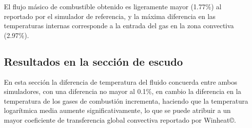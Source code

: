 \par El flujo másico de combustible obtenido es ligeramente mayor (1.77\%) al reportado por el simulador de referencia, y la máxima diferencia en las temperaturas internas corresponde a la entrada del gas en la zona convectiva (2.97\%).

\subsection{Resultados en la sección de escudo}
\par En esta sección la diferencia de temperatura del fluido concuerda entre ambos simuladores, con una diferencia no mayor al 0.1\%, en cambio la diferencia en la temperatura de los gases de combustión incrementa, haciendo que la temperatura logarítmica media aumente significativamente, lo que se puede atribuir a un mayor coeficiente de transferencia global convectiva reportado por Winheat\copyright. 

